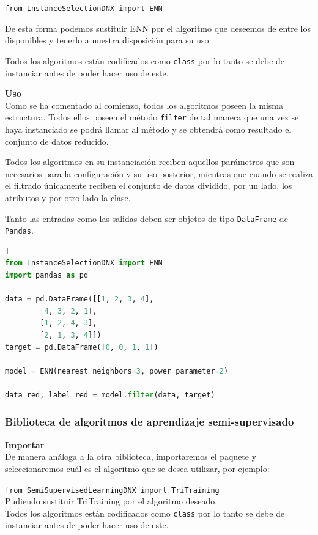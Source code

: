 \texttt{from InstanceSelectionDNX import ENN} 

De esta forma podemos sustituir ENN por el algoritmo que deseemos de entre los disponibles y tenerlo a nuestra disposición para su uso.

Todos los algoritmos están codificados como \texttt{class} por lo tanto se debe de instanciar antes de poder hacer uso de este. 

\textbf{Uso}\\
Como se ha comentado al comienzo, todos los algoritmos poseen la misma estructura. Todos ellos poseen el método \texttt{filter} de tal manera que una vez se haya instanciado se podrá llamar al método y se obtendrá como resultado el conjunto de datos reducido.

Todos los algoritmos en su instanciación reciben aquellos parámetros que son necesarios para la configuración y su uso posterior, mientras que cuando se realiza el filtrado únicamente reciben el conjunto de datos dividido, por un lado, los atributos y por otro lado la clase.

Tanto las entradas como las salidas deben ser objetos de tipo \texttt{DataFrame} de \texttt{Pandas}.

\begin{lstlisting}[language=python, caption={Ejemplo de uso de ENN}]]
from InstanceSelectionDNX import ENN
import pandas as pd

data = pd.DataFrame([[1, 2, 3, 4],
        [4, 3, 2, 1],
        [1, 2, 4, 3],
        [2, 1, 3, 4]])
target = pd.DataFrame([0, 0, 1, 1])

model = ENN(nearest_neighbors=3, power_parameter=2)

data_red, label_red = model.filter(data, target)
\end{lstlisting}

\subsubsection{Biblioteca de algoritmos de aprendizaje semi-supervisado}
\textbf{Importar}\\
De manera análoga a la otra biblioteca, importaremos el paquete y seleccionaremos cuál es el algoritmo que se desea utilizar, por ejemplo:

\texttt{from SemiSupervisedLearningDNX import TriTraining}\\
Pudiendo sustituir TriTraining por el algoritmo deseado.\\
Todos los algoritmos están codificados como \texttt{class} por lo tanto se debe de instanciar antes de poder hacer uso de este. 

